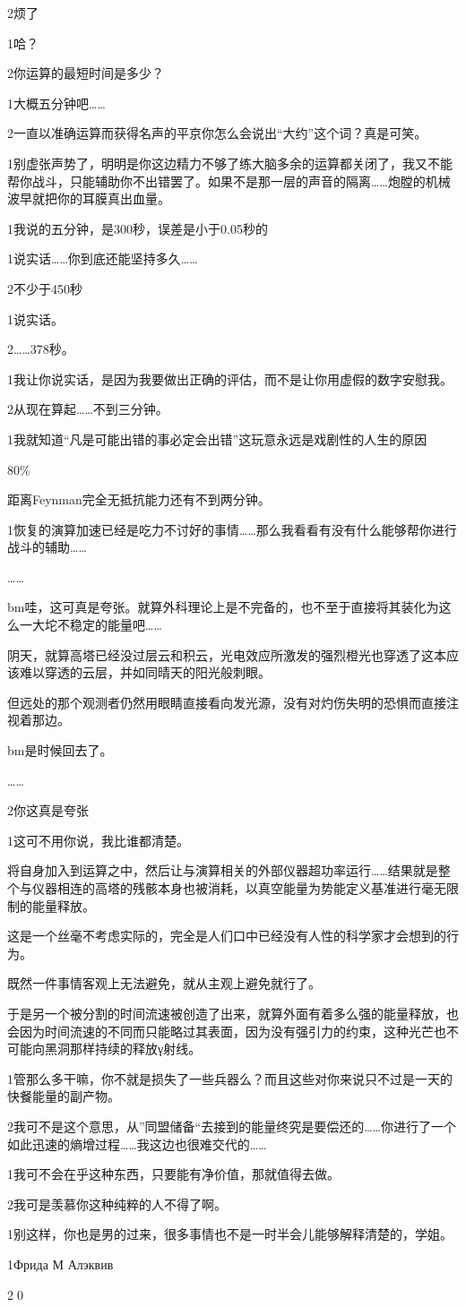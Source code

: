 \documentclass{article}
\begin{document}
2烦了

1哈？

2你运算的最短时间是多少？

1大概五分钟吧……

2一直以准确运算而获得名声的平京你怎么会说出“大约”这个词？真是可笑。

1别虚张声势了，明明是你这边精力不够了练大脑多余的运算都关闭了，我又不能帮你战斗，只能辅助你不出错罢了。如果不是那一层的声音的隔离……炮膛的机械波早就把你的耳膜真出血量。

1我说的五分钟，是300秒，误差是小于0.05秒的

1说实话……你到底还能坚持多久……

2不少于450秒

1说实话。

2……378秒。

1我让你说实话，是因为我要做出正确的评估，而不是让你用虚假的数字安慰我。

2从现在算起……不到三分钟。

1我就知道“凡是可能出错的事必定会出错”这玩意永远是戏剧性的人生的原因

80\%

距离Feynman完全无抵抗能力还有不到两分钟。

1恢复的演算加速已经是吃力不讨好的事情……那么我看看有没有什么能够帮你进行战斗的辅助……

……


bm哇，这可真是夸张。就算外科理论上是不完备的，也不至于直接将其装化为这么一大坨不稳定的能量吧……

阴天，就算高塔已经没过层云和积云，光电效应所激发的强烈橙光也穿透了这本应该难以穿透的云层，并如同晴天的阳光般刺眼。

但远处的那个观测者仍然用眼睛直接看向发光源，没有对灼伤失明的恐惧而直接注视着那边。

bm是时候回去了。

……

2你这真是夸张

1这可不用你说，我比谁都清楚。

将自身加入到运算之中，然后让与演算相关的外部仪器超功率运行……结果就是整个与仪器相连的高塔的残骸本身也被消耗，以真空能量为势能定义基准进行毫无限制的能量释放。

这是一个丝毫不考虑实际的，完全是人们口中已经没有人性的科学家才会想到的行为。

既然一件事情客观上无法避免，就从主观上避免就行了。

于是另一个被分割的时间流速被创造了出来，就算外面有着多么强的能量释放，也会因为时间流速的不同而只能略过其表面，因为没有强引力的约束，这种光芒也不可能向黑洞那样持续的释放γ射线。

1管那么多干嘛，你不就是损失了一些兵器么？而且这些对你来说只不过是一天的快餐能量的副产物。

2我可不是这个意思，从”同盟储备“去接到的能量终究是要偿还的……你进行了一个如此迅速的熵增过程……我这边也很难交代的……

1我可不会在乎这种东西，只要能有净价值，那就值得去做。

2我可是羡慕你这种纯粹的人不得了啊。

1别这样，你也是男的过来，很多事情也不是一时半会儿能够解释清楚的，学姐。

1Фрида М Алэквив


\textcircled{20}
\end{document}
